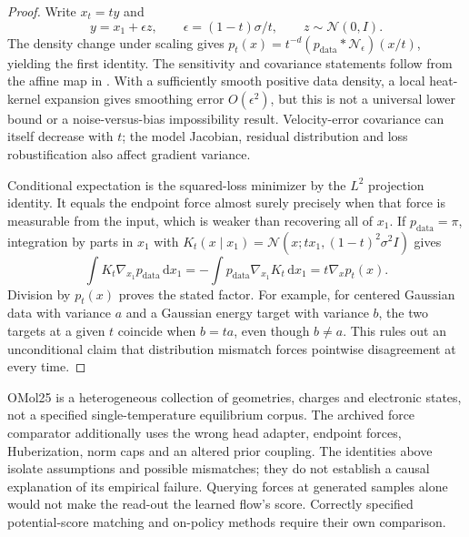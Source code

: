 \begin{proof}
Write $x_t=ty$ and
\begin{equation}
 y=x_1+\epsilon z,\qquad \epsilon=(1-t)\sigma/t,
 \qquad z\sim\mathcal N(0,I).
 \label{eq:app-eps}
\end{equation}
The density change under scaling gives
$p_t(x)=t^{-d}(p_{\mathrm{data}}*\mathcal N_\epsilon)(x/t)$, yielding the first
identity. The sensitivity and covariance statements follow from the affine
map in . With a sufficiently smooth positive data density,
a local heat-kernel expansion gives smoothing error $O(\epsilon^2)$, but
this is not a universal lower bound or a noise-versus-bias impossibility result.
Velocity-error covariance can itself decrease with $t$; the model Jacobian,
residual distribution and loss robustification also affect gradient variance.

Conditional expectation is the squared-loss minimizer by the $L^2$ projection
identity. It equals the endpoint force almost surely precisely when that force
is measurable from the input, which is weaker than recovering all of $x_1$.
If $p_{\mathrm{data}}=\pi$, integration by parts in $x_1$ with
$K_t(x\mid x_1)=\mathcal N(x;t x_1,(1-t)^2\sigma^2I)$ gives
\[
 \int K_t\nabla_{x_1}p_{\mathrm{data}}\,\mathrm dx_1
 =-\int p_{\mathrm{data}}\nabla_{x_1}K_t\,\mathrm dx_1
 =t\nabla_xp_t(x).
\]
Division by $p_t(x)$ proves the stated factor. For example, for centered
Gaussian data with variance $a$ and a Gaussian energy target with variance $b$,
the two targets at a given $t$ coincide when $b=ta$, even though $b\ne a$.
This rules out an unconditional claim that distribution mismatch forces
pointwise disagreement at every time.
\end{proof}

\begin{remark}
\label{rem:antecedent}
OMol25 is a heterogeneous collection of geometries, charges and electronic
states, not a specified single-temperature equilibrium corpus. The archived
force comparator additionally uses the wrong head adapter, endpoint forces,
Huberization, norm caps and an altered prior coupling. The identities above
isolate assumptions and possible mismatches; they do not establish a causal
explanation of its empirical failure. Querying forces at generated samples
alone would not make the read-out the learned flow's score. Correctly specified
potential-score matching and on-policy methods require their own comparison.
\end{remark}

